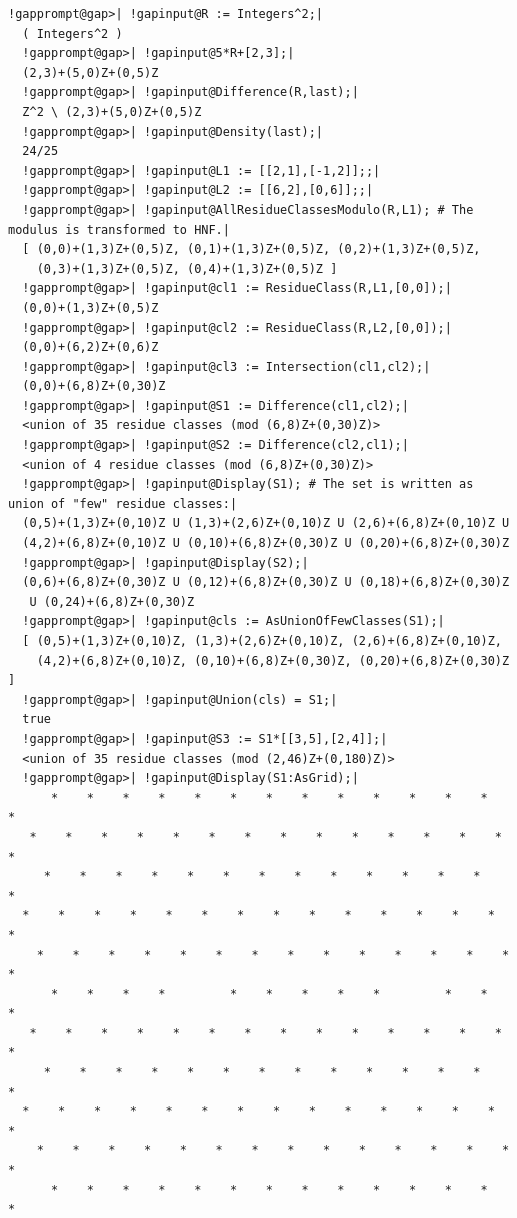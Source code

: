 \documentclass[a4paper,11pt]{report}
\begin{document}
{{\begin{Verbatim}[commandchars=!@|,fontsize=\small,frame=single,label=Example]
  !gapprompt@gap>| !gapinput@R := Integers^2;|
  ( Integers^2 )
  !gapprompt@gap>| !gapinput@5*R+[2,3];|
  (2,3)+(5,0)Z+(0,5)Z
  !gapprompt@gap>| !gapinput@Difference(R,last);|
  Z^2 \ (2,3)+(5,0)Z+(0,5)Z
  !gapprompt@gap>| !gapinput@Density(last);|
  24/25
  !gapprompt@gap>| !gapinput@L1 := [[2,1],[-1,2]];;|
  !gapprompt@gap>| !gapinput@L2 := [[6,2],[0,6]];;|
  !gapprompt@gap>| !gapinput@AllResidueClassesModulo(R,L1); # The modulus is transformed to HNF.|
  [ (0,0)+(1,3)Z+(0,5)Z, (0,1)+(1,3)Z+(0,5)Z, (0,2)+(1,3)Z+(0,5)Z,
    (0,3)+(1,3)Z+(0,5)Z, (0,4)+(1,3)Z+(0,5)Z ]
  !gapprompt@gap>| !gapinput@cl1 := ResidueClass(R,L1,[0,0]);|
  (0,0)+(1,3)Z+(0,5)Z
  !gapprompt@gap>| !gapinput@cl2 := ResidueClass(R,L2,[0,0]);|
  (0,0)+(6,2)Z+(0,6)Z
  !gapprompt@gap>| !gapinput@cl3 := Intersection(cl1,cl2);|
  (0,0)+(6,8)Z+(0,30)Z
  !gapprompt@gap>| !gapinput@S1 := Difference(cl1,cl2);|
  <union of 35 residue classes (mod (6,8)Z+(0,30)Z)>
  !gapprompt@gap>| !gapinput@S2 := Difference(cl2,cl1);|
  <union of 4 residue classes (mod (6,8)Z+(0,30)Z)>
  !gapprompt@gap>| !gapinput@Display(S1); # The set is written as union of "few" residue classes:|
  (0,5)+(1,3)Z+(0,10)Z U (1,3)+(2,6)Z+(0,10)Z U (2,6)+(6,8)Z+(0,10)Z U
  (4,2)+(6,8)Z+(0,10)Z U (0,10)+(6,8)Z+(0,30)Z U (0,20)+(6,8)Z+(0,30)Z
  !gapprompt@gap>| !gapinput@Display(S2);|
  (0,6)+(6,8)Z+(0,30)Z U (0,12)+(6,8)Z+(0,30)Z U (0,18)+(6,8)Z+(0,30)Z
   U (0,24)+(6,8)Z+(0,30)Z
  !gapprompt@gap>| !gapinput@cls := AsUnionOfFewClasses(S1);|
  [ (0,5)+(1,3)Z+(0,10)Z, (1,3)+(2,6)Z+(0,10)Z, (2,6)+(6,8)Z+(0,10)Z,
    (4,2)+(6,8)Z+(0,10)Z, (0,10)+(6,8)Z+(0,30)Z, (0,20)+(6,8)Z+(0,30)Z ]
  !gapprompt@gap>| !gapinput@Union(cls) = S1;|
  true
  !gapprompt@gap>| !gapinput@S3 := S1*[[3,5],[2,4]];|
  <union of 35 residue classes (mod (2,46)Z+(0,180)Z)>
  !gapprompt@gap>| !gapinput@Display(S1:AsGrid);|
      *    *    *    *    *    *    *    *    *    *    *    *    *    *
   *    *    *    *    *    *    *    *    *    *    *    *    *    *    *
     *    *    *    *    *    *    *    *    *    *    *    *    *    *
  *    *    *    *    *    *    *    *    *    *    *    *    *    *    *
    *    *    *    *    *    *    *    *    *    *    *    *    *    *    *
      *    *    *    *         *    *    *    *    *         *    *    *
   *    *    *    *    *    *    *    *    *    *    *    *    *    *    *
     *    *    *    *    *    *    *    *    *    *    *    *    *    *
  *    *    *    *    *    *    *    *    *    *    *    *    *    *    *
    *    *    *    *    *    *    *    *    *    *    *    *    *    *    *
      *    *    *    *    *    *    *    *    *    *    *    *    *    *

\end{Verbatim}}}
\end{document}
